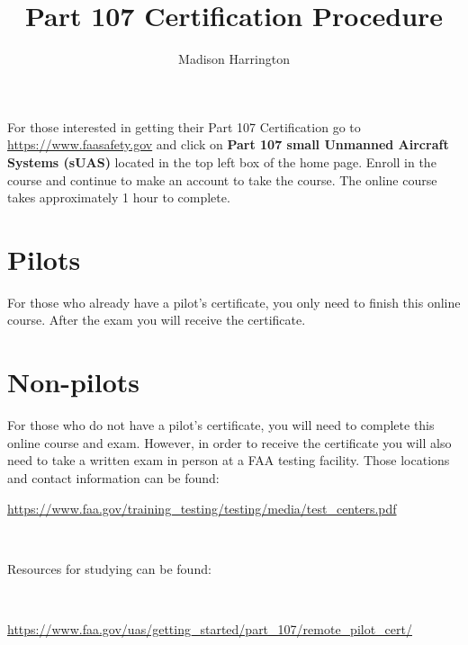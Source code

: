 \documentclass{article}
\begin{document}
\title{Part 107 Certification Procedure}
\author{Madison Harrington}
\maketitle



For those interested in getting their Part 107 Certification go to 
\url{https://www.faasafety.gov}
and click on 
\textbf{Part 107 small Unmanned Aircraft Systems (sUAS)} located in the top left box of the home page. Enroll in the course and continue to make an account to take the course. The online course takes approximately 1 hour to complete.

\section{Pilots}
 
For those who already have a pilot's certificate, you only need to finish this online course. After the exam you will receive the certificate. 
 
 \section{Non-pilots}
 
For those who do not have a pilot's certificate, you will need to complete this online course and exam. However, in order to receive the certificate you will also need to take a written exam in person at a FAA testing facility. Those locations and contact information can be found: 
\ 
 
\url{https://www.faa.gov/training_testing/testing/media/test_centers.pdf} 
 
 \
 
 
 Resources for studying can be found:
 
 
 \
 
\url{https://www.faa.gov/uas/getting_started/part_107/remote_pilot_cert/} 
 
 
 
 
\end{document}
